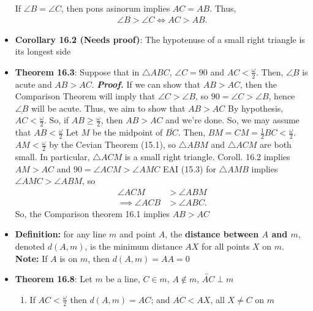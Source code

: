 \documentclass{report}
\begin{document}
\begin{itemize}
            \bigbreak \noindent 
            If $ \angle B = \angle C$, then pons asinorum implies $ AC = AB $. Thus,
            \begin{align*}
                \angle B > \angle C \iff AC > AB
            .\end{align*}
        \item \textbf{Corollary 16.2 (Needs proof)}: The hypotenuse of a small right triangle is its longest side
        \item \textbf{Theorem 16.3}: Suppose that in $\triangle ABC$, $ \angle C = 90$ and $AC  < \frac{\omega}{2} $. Then, $\underline{\angle B}$ is acute and $AB  > AC$.
            \bigbreak \noindent 
            \textbf{\textit{Proof.}} If we can show that $ AB > AC$, then the Comparison Theorem will imply that $\angle C > \angle B$, so $90 = \angle C > \angle B$, hence $\underline{\angle B} $ will be acute. Thus, we aim to show that $ AB > AC $
            \bigbreak \noindent 
            By hypothesis, $ AC < \frac{\omega}{2}$. So, if $ AB \geq \frac{\omega}{2}$, then $ AB > AC$ and we're done. So, we may assume that $AB < \frac{\omega}{2} $
            \bigbreak \noindent 
            Let $M$ be the midpoint of $\overline{BC}$. Then, $BM = CM = \frac{1}{2}BC < \frac{\omega}{2} $. $AM < \frac{\omega}{2}$ by the Cevian Theorem (15.1), so $\triangle ABM$ and $ \triangle ACM$ are both small.
            \bigbreak \noindent 
            In particular, $ \triangle ACM$ is a small right triangle. Coroll. 16.2 implies $AM > AC$ and $ 90 = \angle ACM > \angle AMC$
            \bigbreak \noindent 
            EAI (15.3) for $\triangle AMB$ implies $ \angle AMC > \angle ABM$, so 
            \begin{align*}
                \angle ACM &> \angle ABM \\
                \implies \angle ACB &> \angle ABC
            .\end{align*}
            So, the Comparison theorem 16.1 implies $AB > AC $
        \item \textbf{Definition:} for any line $m$ and point $A$, the \textbf{distance between $A$ and $m$}, denoted $d(A,m)$, is the minimum distance $AX$ for all points $X$ on $m$.
            \bigbreak \noindent 
            \textbf{Note:} If $A$ is on $m$, then $d(A,m) = AA = 0$
        \item \textbf{Theorem 16.8}: Let $m$ be a line, $C \in m$, $A \not\in m$, $\overleftrightarrow{AC} \perp m$
            \begin{enumerate}[label=(\alph*)]
                \item If $AC < \frac{\omega}{2}$ then $d(A,m) = AC$; and $AC < AX$, all $X \ne C$ on $m$

\end{enumerate}
\end{itemize}
\end{document}
